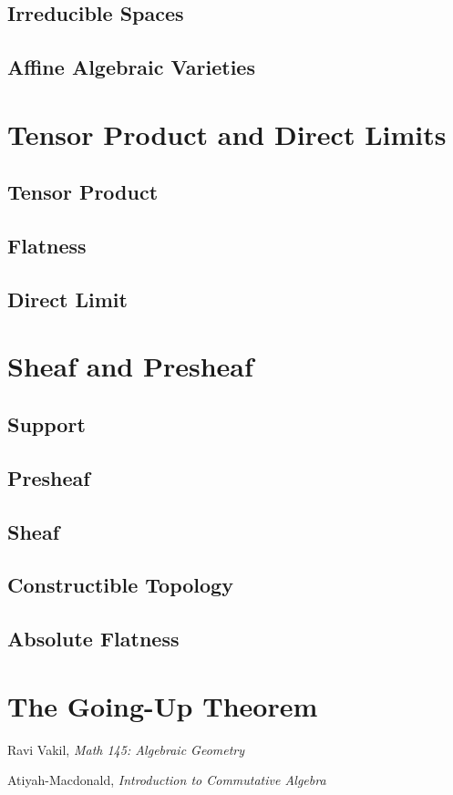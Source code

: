 \documentclass[]{report}
\begin{document}
\section{Irreducible Spaces}
\section{Affine Algebraic Varieties}


\chapter{Tensor Product and Direct Limits}
\section{Tensor Product}
\section{Flatness}
\section{Direct Limit}

\chapter{Sheaf and Presheaf}
\section{Support}
\section{Presheaf}
\section{Sheaf}
\section{Constructible Topology}
\section{Absolute Flatness}

\chapter{The Going-Up Theorem}

\begin{thebibliography}{9}

    Ravi Vakil,
    \textit{Math 145: Algebraic Geometry}

    Atiyah-Macdonald, 
    \textit{Introduction to Commutative Algebra}
\end{thebibliography}
\end{document}
